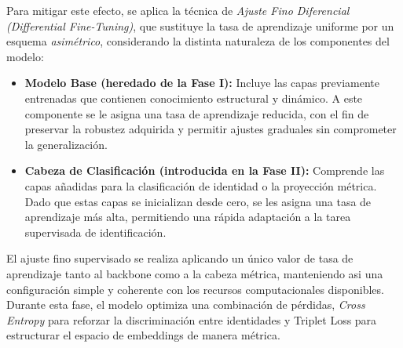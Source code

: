 Para mitigar este efecto, se aplica la técnica de \textit{Ajuste Fino Diferencial (Differential Fine-Tuning)}, que sustituye la tasa de aprendizaje uniforme por un esquema \textit{asimétrico}, considerando la distinta naturaleza de los componentes del modelo:  

\begin{itemize}
    \item \textbf{Modelo Base (heredado de la Fase I):} Incluye las capas previamente entrenadas que contienen conocimiento estructural y dinámico. A este componente se le asigna una tasa de aprendizaje reducida, con el fin de preservar la robustez adquirida y permitir ajustes graduales sin comprometer la generalización.

    \item \textbf{Cabeza de Clasificación (introducida en la Fase II):} Comprende las capas añadidas para la clasificación de identidad o la proyección métrica. Dado que estas capas se inicializan desde cero, se les asigna una tasa de aprendizaje más alta, permitiendo una rápida adaptación a la tarea supervisada de identificación.
\end{itemize}

El ajuste fino supervisado se realiza aplicando un único valor de tasa de aprendizaje tanto al backbone como a la cabeza métrica, manteniendo asi una configuración simple y coherente con los recursos computacionales disponibles. Durante esta fase, el modelo optimiza una combinación de pérdidas, \textit{Cross Entropy} para reforzar la discriminación entre identidades y Triplet Loss para estructurar el espacio de embeddings de manera métrica.

